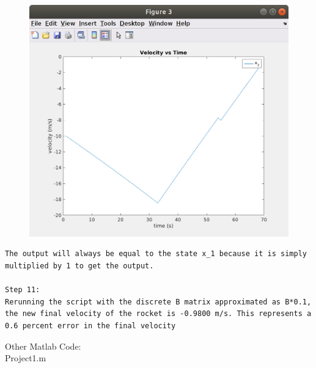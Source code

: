 \documentclass[11pt]{article}
\begin{document}
\begin{figure}[H]
            \centering
            \includegraphics[width=15cm]{fig3.png}
\end{figure}


\begin{lstlisting}[style=lstMat]
The output will always be equal to the state x_1 because it is simply multiplied by 1 to get the output.

Step 11:
Rerunning the script with the discrete B matrix approximated as B*0.1, the new final velocity of the rocket is -0.9800 m/s. This represents a 0.6 percent error in the final velocity 
\end{lstlisting}
Other Matlab Code:\\
Project1.m
	
\end{document}
